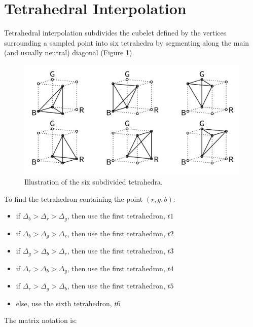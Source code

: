 \section{Tetrahedral Interpolation}
Tetrahedral interpolation subdivides the cubelet defined by the vertices surrounding a sampled point into six tetrahedra by segmenting along the main (and usually neutral) diagonal (Figure \ref{fig:tetrahedra}). 

\begin{figure}[htbp]
\begin{center}
    \includegraphics[width=6in]{images/interp-tetrahedrons.png}
\caption{Illustration of the six subdivided tetrahedra.}
\label{fig:tetrahedra}
\end{center}
\end{figure}

To find the tetrahedron containing the point \((r,g,b)\):
\begin{itemize}
    \item if \(\Delta_b > \Delta_r > \Delta_g\), then use the first tetrahedron, \(t1\)
    \item if \(\Delta_b > \Delta_g > \Delta_r\), then use the first tetrahedron, \(t2\)
    \item if \(\Delta_g > \Delta_b > \Delta_r\), then use the first tetrahedron, \(t3\)
    \item if \(\Delta_r > \Delta_b > \Delta_g\), then use the first tetrahedron, \(t4\)
    \item if \(\Delta_r > \Delta_g > \Delta_b\), then use the first tetrahedron, \(t5\)
    \item else, use the sixth tetrahedron, \(t6\)
\end{itemize}

The matrix notation is:

